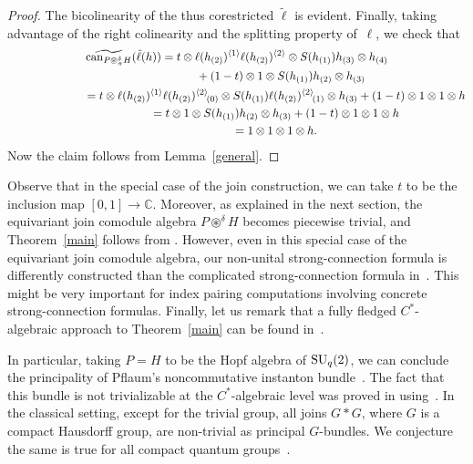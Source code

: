 \documentclass[pdftex]{sigma}
\numberwithin{equation}{section}
\begin{document}
\begin{proof}
The bicolinearity of the thus corestricted $\tilde\ell$ is evident. Finally, taking
advantage of the right colinearity and the splitting property of~$\ell$, we check that
\begin{gather*}
 \widetilde{\operatorname{can}_{P\circledast^\delta_\pi H}}(\tilde\ell (h)) =
 t \otimes  \ell (h_{(2)})^{\langle 1\rangle}\ell (h_{(2)})^{\langle 2\rangle}
\otimes S(h_{(1)})  h_{(3)}\otimes h_{(4)}\\
\hphantom{\widetilde{\operatorname{can}_{P\circledast^\delta_\pi H}}(\tilde\ell (h)) =}{}
+ (1-t) \otimes 1 \otimes S(h_{(1)})h_{(2)} \otimes h_{(3)}
 \\
\hphantom{\widetilde{\operatorname{can}_{P\circledast^\delta_\pi H}}(\tilde\ell (h))}{} =  t \otimes  \ell (h_{(2)})^{\langle 1\rangle}\ell (h_{(2)})^{\langle 2\rangle}\!{}_{(0)} \otimes S(h_{(1)})
\ell (h_{(2)})^{\langle 2\rangle}\!{}_{(1)}\otimes h_{(3)}
+ (1-t) \otimes 1 \otimes 1 \otimes h
 \\
\hphantom{\widetilde{\operatorname{can}_{P\circledast^\delta_\pi H}}(\tilde\ell (h))}{} =  t \otimes  1 \otimes S(h_{(1)})  h_{(2)}\otimes h_{(3)}
+ (1-t) \otimes 1 \otimes 1 \otimes h
 \\
\hphantom{\widetilde{\operatorname{can}_{P\circledast^\delta_\pi H}}(\tilde\ell (h))}{}
 =  1 \otimes  1 \otimes 1 \otimes h.
\end{gather*}
Now the claim follows from Lemma~\ref{general}.
\end{proof}

Observe that in the special case of the join construction, we can take $t$ to be the inclusion map
$[0,1]\to\mathbb{C}$. Moreover, as explained in the next section, the equivariant join
comodule algebra $P\circledast^\delta H$
becomes piecewise trivial, and Theorem~\ref{main} follows from \cite[Lemma~3.2]{hkmz11}.
However, even in this special case of the equivariant join comodule algebra,
our non-unital strong-connection formula is dif\/ferently constructed than the complicated strong-connection
 formula in~\cite[Lemma~3.2]{hkmz11}. This might be very important for index pairing computations involving
concrete strong-connection formulas.
Finally, let us remark that a fully f\/ledged \mbox{$C^*$-algebraic} approach to Theorem~\ref{main}
can be found in~\cite{ddhw}.

\begin{Example}
In particular, taking $P=H$ to be the Hopf algebra of ${\rm SU}_q(2)$, we can conclude
the principality of Pf\/laum's noncommutative instanton
bundle~\cite{p-mj94}. The fact that this bundle is not trivializable at the $C^*$-algebraic level
 was proved in \cite{bdah} using~\cite{dhhmw12}.
In the classical setting,
except for the trivial group,
all joins $G*G$, where $G$ is a compact Hausdorf\/f group, are non-trivial as principal $G$-bundles. We
conjecture the same is true for all compact quantum groups~\cite{w-sl98}.
\end{Example}
\end{document}
